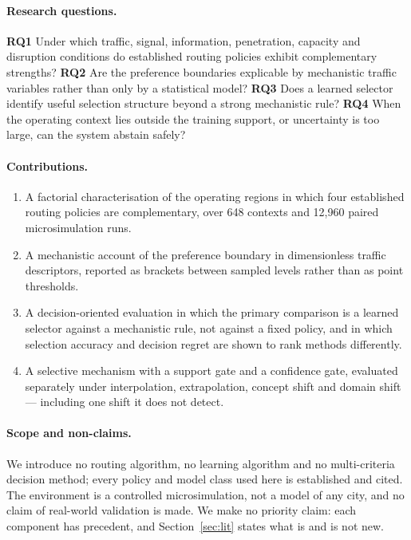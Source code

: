 \documentclass[runningheads]{llncs}
\begin{document}
\paragraph{Research questions.}
\textbf{RQ1} Under which traffic, signal, information, penetration, capacity and
disruption conditions do established routing policies exhibit complementary
strengths?
\textbf{RQ2} Are the preference boundaries explicable by mechanistic traffic
variables rather than only by a statistical model?
\textbf{RQ3} Does a learned selector identify useful selection structure beyond
a strong mechanistic rule?
\textbf{RQ4} When the operating context lies outside the training support, or
uncertainty is too large, can the system abstain safely?

\paragraph{Contributions.}
\begin{enumerate}
\item A factorial characterisation of the operating regions in which four
established routing policies are complementary, over 648 contexts
and 12{,}960 paired microsimulation runs.
\item A mechanistic account of the preference boundary in dimensionless traffic
descriptors, reported as brackets between sampled levels rather than as point
thresholds.
\item A decision-oriented evaluation in which the primary comparison is a
learned selector against a mechanistic rule, not against a fixed policy, and in
which selection accuracy and decision regret are shown to rank methods
differently.
\item A selective mechanism with a support gate and a confidence gate,
evaluated separately under interpolation, extrapolation, concept shift and
domain shift --- including one shift it does not detect.
\end{enumerate}

\paragraph{Scope and non-claims.}
We introduce no routing algorithm, no learning algorithm and no multi-criteria
decision method; every policy and model class used here is established and
cited. The environment is a controlled microsimulation, not a model of any
city, and no claim of real-world validation is made. We make no priority claim:
each component has precedent, and Section~\ref{sec:lit} states what is and is
not new.
\end{document}
